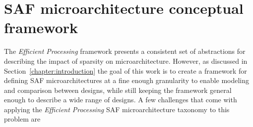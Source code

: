 \chapter{SAF microarchitecture conceptual framework}
\label{chapter:conceptual_framework}

The \textit{Efficient Processing} framework presents a consistent set of abstractions for describing the impact of sparsity on microarchitecture. However, as discussed in Section~\ref{chapter:introduction} the goal of this work is to create a framework for defining SAF microarchitectures at a fine enough granularity to enable modeling and comparison between designs, while still keeping the framework general enough to describe a wide range of designs. A few challenges that come with applying the \textit{Efficient Processing} SAF microarchitecture taxonomy to this problem are

